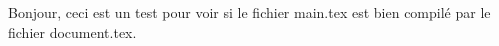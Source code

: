 \documentclass[11pt]{document}
\begin{document}
Bonjour, ceci est un test pour voir si le fichier main.tex est bien compilé par le fichier document.tex.


    
    
\end{document}
